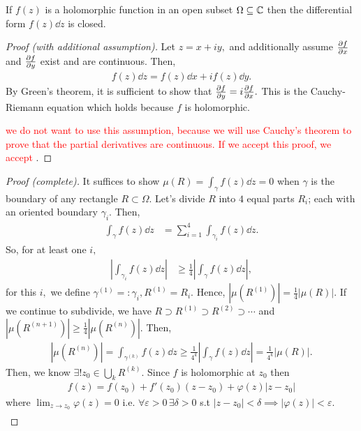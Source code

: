 \documentclass[a4paper,12pt]{article}
\begin{document}
\begin{theorem}[Cauchy]
    If $f(z)$ is a holomorphic function in an open subset $\Omega\subseteq\mathbb{C}$ then the differential form $f(z)\dd z$ is closed.
    \begin{proof}[Proof (with additional assumption)] Let $z=x+iy,$ and additionally assume $\partialderivative{f}{x}$ and $\partialderivative{f}{y}$ exist and are continuous. Then, \begin{align}
        f(z)\dd z=f(z)\dd x+if(z)\dd y.
    \end{align}
    By Green's theorem, it is sufficient to show that $\partialderivative{f}{y}=i\partialderivative{f}{x}.$ This is the Cauchy-Riemann equation which holds because $f$ is holomorphic.
    
     \textcolor{red}{we do not want to use this assumption, because we will use Cauchy's theorem to prove that the partial derivatives are continuous. If we accept this proof, we accept} . 
    \end{proof}
    \begin{proof}[Proof (complete)]
        It suffices to show $\mu(R)=\int_\gamma f(z)\dd z=0$ when $\gamma$ is the boundary of any rectangle $R\subset\Omega.$ Let's divide $R$ into $4$ equal parts $R_i$; each with an oriented boundary $\gamma_i.$ Then, \begin{align}
            \int_\gamma f(z)\dd z&=\sum_{i=1}^4\int_{\gamma_i} f(z)\dd z.
        \end{align}
        So, for at least one $i,$ \begin{align}
            \left|\int_{\gamma_i} f(z)\dd z\right|&\geq\frac{1}{4}\left|\int_\gamma f(z)\dd z\right|,
        \end{align}
        for this $i,$ we define $\gamma^{(1)}=:\gamma_i,R^{(1)}=R_i.$ Hence, $|\mu(R^{(1)})|=\frac{1}{4}|\mu(R)|.$ If we continue to subdivide, we have $R\supset R^{(1)}\supset R^{(2)}\supset\cdots$ and $|\mu(R^{(n+1)})|\geq\frac{1}{4}|\mu(R^{(n)})|.$ Then, \begin{align}
            |\mu(R^{(n)})|=\int_{\gamma^{(k)}}f(z)\dd z\geq \frac{1}{4^k}\left|\int_\gamma f(z)\dd z\right|=\frac{1}{4^k}|\mu(R)|.
        \end{align}
        Then, we know $\exists! z_0\in\bigcup_k R^{(k)}.$ Since $f$ is holomorphic at $z_0$ then \begin{align}
            f(z)=f(z_0)+f'(z_0)(z-z_0)+\varphi(z)|z-z_0|
        \end{align}
        where $\lim_{z\to z_0}\varphi(z)=0$ i.e. $\forall\varepsilon>0\,\exists\delta>0$ s.t $|z-z_0|<\delta\implies|\varphi(z)|<\varepsilon.$ \begin{align}

\end{align}
\end{proof}
\end{theorem}
\end{document}
